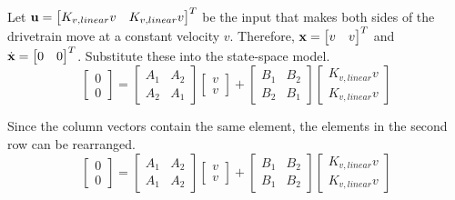 Let $\mathbf{u} =
\begin{bmatrix}
  K_{v,linear} v & K_{v,linear} v
\end{bmatrix}^T$ be the input that makes both sides of the drivetrain move at a
constant velocity $v$. Therefore, $\mathbf{x} =
\begin{bmatrix}
  v & v
\end{bmatrix}^T$ and $\dot{\mathbf{x}} =
\begin{bmatrix}
  0 & 0
\end{bmatrix}^T$. Substitute these into the state-space model.
\begin{equation*}
  \begin{bmatrix}
    0 \\
    0
  \end{bmatrix} =
  \begin{bmatrix}
    A_1 & A_2 \\
    A_2 & A_1
  \end{bmatrix}
  \begin{bmatrix}
    v \\
    v
  \end{bmatrix} +
  \begin{bmatrix}
    B_1 & B_2 \\
    B_2 & B_1
  \end{bmatrix}
  \begin{bmatrix}
    K_{v,linear} v \\
    K_{v,linear} v
  \end{bmatrix}
\end{equation*}

Since the column vectors contain the same element, the elements in the second
row can be rearranged.
\begin{equation*}
  \begin{bmatrix}
    0 \\
    0
  \end{bmatrix} =
  \begin{bmatrix}
    A_1 & A_2 \\
    A_1 & A_2
  \end{bmatrix}
  \begin{bmatrix}
    v \\
    v
  \end{bmatrix} +
  \begin{bmatrix}
    B_1 & B_2 \\
    B_1 & B_2
  \end{bmatrix}
  \begin{bmatrix}
    K_{v,linear} v \\
    K_{v,linear} v
  \end{bmatrix}
\end{equation*}

